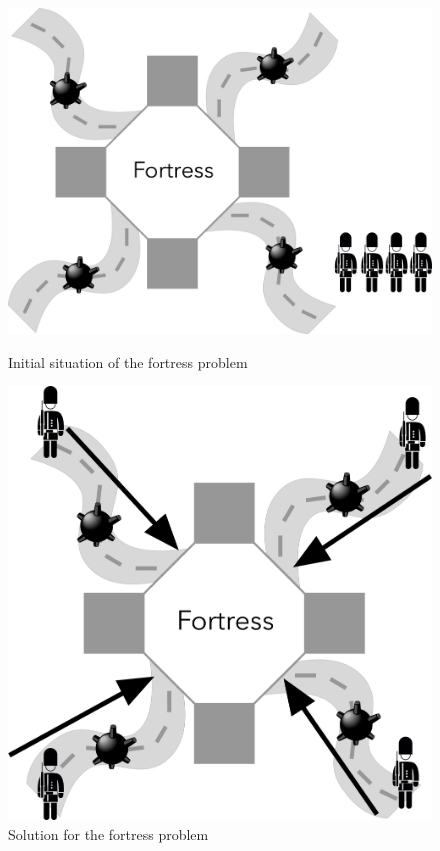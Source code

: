 \documentclass[12pt]{article}
\begin{document}
\begin{figure}[H]
    \centering
    \begin{minipage}[b]{0.4\textwidth}
    	\includegraphics[scale=0.08]{images/fortress_problem.png}
    	\caption{Initial situation of the fortress problem}
    	\label{fig:fortress}
    \end{minipage}
    \hfill
    \begin{minipage}[b]{0.4\textwidth}
    	\includegraphics[scale=0.08]{images/fortress_problem_solution.png}
    	\caption{Solution for the fortress problem}
    	\label{fig:fortress_solution}
    \end{minipage}
\end{figure}
\end{document}
